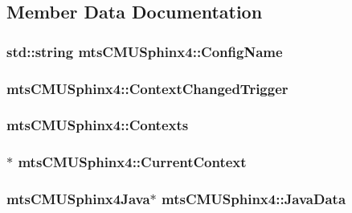 \subsection{Member Data Documentation}
\hypertarget{classmts_c_m_u_sphinx4_ae28ac772c7e862fb2207c09cb4c39137}{
\subsubsection[{Config\-Name}]{\setlength{\rightskip}{0pt plus 5cm}std\-::string mts\-C\-M\-U\-Sphinx4\-::\-Config\-Name}}\label{classmts_c_m_u_sphinx4_ae28ac772c7e862fb2207c09cb4c39137}
\hypertarget{classmts_c_m_u_sphinx4_a117f1e3a1942cb21a1c54666f17c153f}{
\subsubsection[{Context\-Changed\-Trigger}]{ mts\-C\-M\-U\-Sphinx4\-::\-Context\-Changed\-Trigger}}\label{classmts_c_m_u_sphinx4_a117f1e3a1942cb21a1c54666f17c153f}
\hypertarget{classmts_c_m_u_sphinx4_a9ab5ad8754d6f798d08792ca5c7c0e14}{
\subsubsection[{Contexts}]{ mts\-C\-M\-U\-Sphinx4\-::\-Contexts}}\label{classmts_c_m_u_sphinx4_a9ab5ad8754d6f798d08792ca5c7c0e14}
\hypertarget{classmts_c_m_u_sphinx4_af18513545284a63b71ebe36511d7a6b1}{
\subsubsection[{Current\-Context}]{$\ast$ mts\-C\-M\-U\-Sphinx4\-::\-Current\-Context}}\label{classmts_c_m_u_sphinx4_af18513545284a63b71ebe36511d7a6b1}
\hypertarget{classmts_c_m_u_sphinx4_a16f510ea20ba70000841f1e8be81b0b9}{
\subsubsection[{Java\-Data}]{\setlength{\rightskip}{0pt plus 5cm}mts\-C\-M\-U\-Sphinx4\-Java$\ast$ mts\-C\-M\-U\-Sphinx4\-::\-Java\-Data}}\label{classmts_c_m_u_sphinx4_a16f510ea20ba70000841f1e8be81b0b9}
